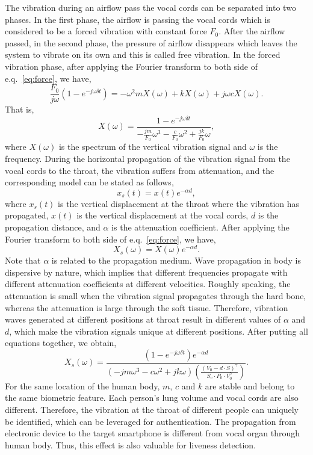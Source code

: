 The vibration during an airflow pass the vocal cords can be separated into two phases. In the first phase, the airflow is passing the vocal cords which is considered to be a forced vibration with constant force $F_0$. After the airflow passed, in the second phase, the pressure of airflow disappears which leaves the system to vibrate on its own and this is called free vibration. In the forced vibration phase, after applying the Fourier transform to both side of e.q.~\eqref{eq:force}, we have,
\begin{displaymath}
\frac{F_0}{j \omega}(1-e^{-j\omega \delta t}) = - \omega^2 m X(\omega) + k X(\omega) + j \omega c X(\omega).
\end{displaymath}
That is,
\begin{displaymath}
X(\omega) = \frac{1-e^{-j\omega \delta t}}{-\frac{j m}{F_0} \omega^3 - \frac{c}{F_0} \omega^2 + \frac{j k}{F_0} \omega},
\end{displaymath}
where $X(\omega)$ is the spectrum of the vertical vibration signal and $\omega$ is the frequency. 
During the horizontal propagation of the vibration signal from the vocal cords to the throat, the vibration suffers from attenuation, and the corresponding model can be stated as follows,
\begin{displaymath}
x_s(t) = x(t) e^{-\alpha d},
\end{displaymath}
where $x_s(t)$ is the vertical displacement at the throat where the vibration has propagated, $x(t)$ is the vertical displacement at the vocal cords, $d$ is the propagation distance, and $\alpha$ is the attenuation coefficient. 
After applying the Fourier transform to both side of e.q.~\eqref{eq:force}, we have,
\begin{displaymath}
X_s(\omega) = X(\omega) e^{-\alpha d}.
\end{displaymath}
Note that $\alpha$ is related to the propagation medium. Wave propagation in body is dispersive by nature, which implies that different frequencies propagate with different attenuation coefficients at different velocities. Roughly speaking, the attenuation is small when the vibration signal propagates through the hard bone, whereas the attenuation is large through the soft tissue. Therefore, vibration waves generated at different positions at throat result in different values of $\alpha$ and $d$, which make the vibration signals unique at different positions. 
After putting all equations together, we obtain,
\begin{displaymath}
X_s(\omega) = \frac{(1-e^{-j\omega \delta t}) e^{-\alpha d}}{(-jm\omega^3 - c \omega^2 + jk\omega)(\frac{(V_0 - d \cdot S)^\gamma}{S_v \cdot P_0 \cdot V^\gamma_0 })}.
\end{displaymath}
For the same location of the human body, $m$, $c$ and $k$ are stable and belong to the same biometric feature. Each person’s lung volume and vocal cords are also different. Therefore, the vibration at the throat of different people can uniquely be identified, which can be leveraged for authentication. The propagation from electronic device to the target smartphone is different from vocal organ through human body. Thus, this effect is also valuable for liveness detection.


